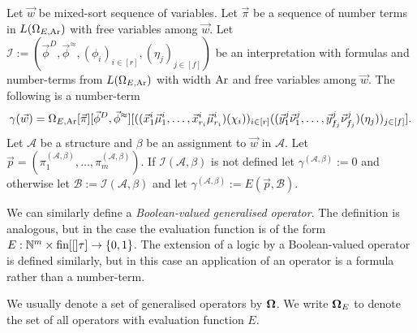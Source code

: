 \documentclass[../main/thesis.tex]{subfiles}
\begin{document}
Let $\vec{w}$ be mixed-sort sequence of variables. Let $\vec{\pi}$ be a sequence
of number terms in $L(\Omega_{E, \text{\upshape Ar}})$ with free variables among $\vec{w}$. Let
$\mathcal{I} := (\vec{\phi}^D, \vec{\phi}^{\approx}, (\phi_i)_{i \in [r]},
(\eta_j)_{j \in [f]})$ be an interpretation with formulas and number-terms from
$L(\Omega_{E, \text{\upshape Ar}})$ with width $\text{\upshape Ar}$ and free variables among $\vec{w}$. The
following is a number-term
\begin{align*}
  \gamma (\vec{w}) = \Omega_{E, \text{\upshape Ar}} [\vec{\pi}] [\vec{\phi}^D, \vec{\phi}^{\approx}]  [((\vec{x}^i_1 \vec{\mu}^i_1, \ldots, \vec{x}^i_{r_i} \vec{\mu}^i_{r_i})(\chi_i))_{i \in [r]}((\vec{y}^j_1 \vec{\nu}^j_1, \ldots, \vec{y}^j_{f_j} \vec{\nu}^j_{f_j})(\eta_j))_{j \in [f]}].
\end{align*}
Let $\mathcal{A}$ be a structure and $\beta$ be an assignment to $\vec{w}$ in
$\mathcal{A}$. Let $\vec{p} = (\pi^{(\mathcal{A}, \beta)}_1, \ldots,
\pi^{(\mathcal{A}, \beta)}_m)$. If $\mathcal{I}(\mathcal{A}, \beta)$ is not
defined let $\gamma^{(\mathcal{A}, \beta)} := 0$ and otherwise let $\mathcal{B}
:= \mathcal{I}(\mathcal{A}, \beta)$ and let $\gamma^{(\mathcal{A}, \beta)} := E
(\vec{p}, \mathcal{B})$.

We can similarly define a \emph{Boolean-valued generalised operator}. The
definition is analogous, but in the case the evaluation function is of the form
$E : \mathbb{N}^{m} \times \text{\upshape fin}{[[]}\tau] \rightarrow \{0,1\}$. The extension of a logic by a
Boolean-valued operator is defined similarly, but in this case an application of
an operator is a formula rather than a number-term.

We usually denote a set of generalised operators by $\mathbf{\mathbf{\Omega}}$. We write
$\mathbf{\mathbf{\Omega}}_E$ to denote the set of all operators with evaluation function $E$.








\end{document}
